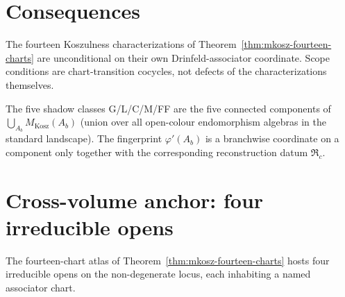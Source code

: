 \section{Consequences}
\label{sec:mkosz-consequences}

\begin{corollary}
The fourteen Koszulness characterizations of
Theorem~\ref{thm:mkosz-fourteen-charts} are unconditional on their own
Drinfeld-associator coordinate. Scope conditions are chart-transition
cocycles, not defects of the characterizations themselves.
\end{corollary}

\begin{corollary}
The five shadow classes G/L/C/M/FF are the five connected components of
$\bigcup_{A_b} M_{\mathrm{Kosz}}(A_b)$ (union over all open-colour
endomorphism algebras in the standard landscape). The fingerprint
$\varphi'(A_b)$ is a branchwise coordinate on a component only together
with the corresponding reconstruction datum \(\mathfrak R_c\).
\end{corollary}

\section{Cross-volume anchor: four irreducible opens}
\label{sec:mkosz-anchor}

The fourteen-chart atlas of Theorem~\ref{thm:mkosz-fourteen-charts}
hosts four irreducible opens on the non-degenerate locus, each
inhabiting a named associator chart.

